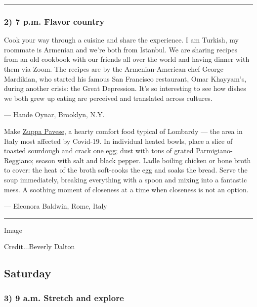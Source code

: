 \begin{center}\rule{0.5\linewidth}{\linethickness}\end{center}

\hypertarget{2-7-pm-flavor-country}{%
\subsubsection{\texorpdfstring{\textbf{2) 7 p.m. Flavor
country}}{2) 7 p.m. Flavor country}}\label{2-7-pm-flavor-country}}

Cook your way through a cuisine and share the experience. I am Turkish,
my roommate is Armenian and we're both from Istanbul. We are sharing
recipes from an old cookbook with our friends all over the world and
having dinner with them via Zoom. The recipes are by the
Armenian-American chef George Mardikian, who started his famous San
Francisco restaurant, Omar Khayyam's, during another crisis: the Great
Depression. It's so interesting to see how dishes we both grew up eating
are perceived and translated across cultures.

--- Hande Oynar, Brooklyn, N.Y.

Make
\href{https://cooking.nytimes3xbfgragh.onion/recipes/9814-zuppa-pavese}{Zuppa
Pavese}, a hearty comfort food typical of Lombardy --- the area in Italy
most affected by Covid-19. In individual heated bowls, place a slice of
toasted sourdough and crack one egg; dust with tons of grated
Parmigiano-Reggiano; season with salt and black pepper. Ladle boiling
chicken or bone broth to cover: the heat of the broth soft-cooks the egg
and soaks the bread. Serve the soup immediately, breaking everything
with a spoon and mixing into a fantastic mess. A soothing moment of
closeness at a time when closeness is not an option.

--- Eleonora Baldwin, Rome, Italy

\begin{center}\rule{0.5\linewidth}{\linethickness}\end{center}

Image

Credit...Beverly Dalton

\hypertarget{saturday}{%
\subsection{Saturday}\label{saturday}}

\hypertarget{3-9-am-stretch-and-explore}{%
\subsubsection{\texorpdfstring{\textbf{3) 9 a.m. Stretch and
explore}}{3) 9 a.m. Stretch and explore}}\label{3-9-am-stretch-and-explore}}

